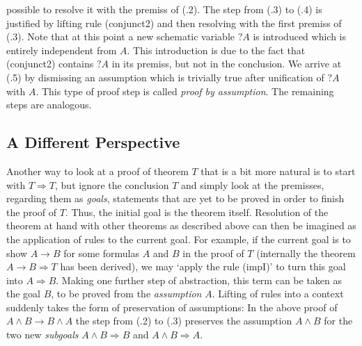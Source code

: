 \begin{expl}
  possible to resolve it with the premiss of (.2). The step from (.3) to (.4) is
  justified by lifting rule (conjunct2) and then resolving with the first
  premiss of (.3). Note that at this point a new schematic variable $?A$ is
  introduced which is entirely independent from $A$. This introduction is due to
  the fact that (conjunct2) contains $?A$ in its premiss, but not in the
  conclusion. We arrive at (.5) by dismissing an assumption which is trivially
  true after unification of $?A$ with $A$. This type of proof step is called
  \emph{proof by assumption}. The remaining steps are analogous.
\end{expl}



\subsection{A Different Perspective}
\label{sec:diff-persp}


Another way to look at a proof of theorem $T$ that is a bit more natural is to
start with $T \Longrightarrow T$, but ignore the conclusion $T$ and simply look at the
premisses, regarding them as \emph{goals}, \IE statements that are yet to be
proved in order to finish the proof of $T$. Thus, the initial goal is the
theorem itself. Resolution of the theorem at hand with other theorems as
described above can then be imagined as the application of rules to the current
goal. For example, if the current goal is to show $A \longrightarrow B$ for some formulas $A$
and $B$ in the proof of $T$ (\IE internally the theorem $A \longrightarrow B \Longrightarrow T$ has been
derived), we may `apply the rule (impI)' to turn this goal into $A \Longrightarrow B$. Making
one further step of abstraction, this term can be taken as the goal $B$, to be
proved from the \emph{assumption} $A$. Lifting of rules into a context suddenly
takes the form of preservation of assumptions: In the above proof of $A\land B\longrightarrow B\land A$
the step from (.2) to (.3) preserves the assumption $A\land B$ for the two new
\emph{subgoals} $A\land B\Longrightarrow B$ and $A\land B \Longrightarrow A$.

